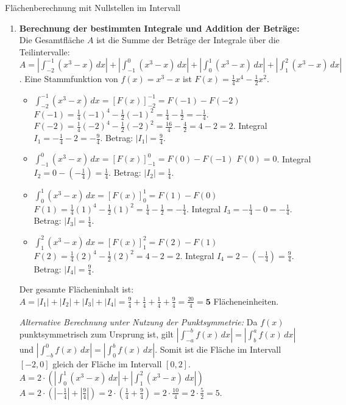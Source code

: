 \begin{loesungsumgebung}{Flächenberechnung mit Nullstellen im Intervall}
\begin{enumerate}
    \item \textbf{Berechnung der bestimmten Integrale und Addition der Beträge:}
    Die Gesamtfläche $A$ ist die Summe der Beträge der Integrale über die Teilintervalle:
    $A = \left| \int_{-2}^{-1} (x^3-x) \,dx \right| + \left| \int_{-1}^{0} (x^3-x) \,dx \right| + \left| \int_{0}^{1} (x^3-x) \,dx \right| + \left| \int_{1}^{2} (x^3-x) \,dx \right|$.
    Eine Stammfunktion von $f(x) = x^3-x$ ist $F(x) = \frac{1}{4}x^4 - \frac{1}{2}x^2$.
    \begin{itemize}
        \item $\int_{-2}^{-1} (x^3-x) \,dx = [F(x)]_{-2}^{-1} = F(-1) - F(-2)$
        $F(-1) = \frac{1}{4}(-1)^4 - \frac{1}{2}(-1)^2 = \frac{1}{4} - \frac{1}{2} = -\frac{1}{4}$.
        $F(-2) = \frac{1}{4}(-2)^4 - \frac{1}{2}(-2)^2 = \frac{16}{4} - \frac{4}{2} = 4 - 2 = 2$.
        Integral $I_1 = -\frac{1}{4} - 2 = -\frac{9}{4}$. Betrag: $|I_1| = \frac{9}{4}$.

        \item $\int_{-1}^{0} (x^3-x) \,dx = [F(x)]_{-1}^{0} = F(0) - F(-1)$
        $F(0) = 0$.
        Integral $I_2 = 0 - (-\frac{1}{4}) = \frac{1}{4}$. Betrag: $|I_2| = \frac{1}{4}$.

        \item $\int_{0}^{1} (x^3-x) \,dx = [F(x)]_{0}^{1} = F(1) - F(0)$
        $F(1) = \frac{1}{4}(1)^4 - \frac{1}{2}(1)^2 = \frac{1}{4} - \frac{1}{2} = -\frac{1}{4}$.
        Integral $I_3 = -\frac{1}{4} - 0 = -\frac{1}{4}$. Betrag: $|I_3| = \frac{1}{4}$.

        \item $\int_{1}^{2} (x^3-x) \,dx = [F(x)]_{1}^{2} = F(2) - F(1)$
        $F(2) = \frac{1}{4}(2)^4 - \frac{1}{2}(2)^2 = 4 - 2 = 2$.
        Integral $I_4 = 2 - (-\frac{1}{4}) = \frac{9}{4}$. Betrag: $|I_4| = \frac{9}{4}$.
    \end{itemize}
    Der gesamte Flächeninhalt ist:
    $A = |I_1| + |I_2| + |I_3| + |I_4| = \frac{9}{4} + \frac{1}{4} + \frac{1}{4} + \frac{9}{4} = \frac{20}{4} = \mathbf{5}$ Flächeneinheiten.

    \textit{Alternative Berechnung unter Nutzung der Punktsymmetrie:}
    Da $f(x)$ punktsymmetrisch zum Ursprung ist, gilt $\left| \int_{-a}^{-b} f(x) \,dx \right| = \left| \int_{b}^{a} f(x) \,dx \right|$ und $\left| \int_{-b}^{0} f(x) \,dx \right| = \left| \int_{0}^{b} f(x) \,dx \right|$.
    Somit ist die Fläche im Intervall $[-2,0]$ gleich der Fläche im Intervall $[0,2]$.
    $A = 2 \cdot \left( \left| \int_{0}^{1} (x^3-x) \,dx \right| + \left| \int_{1}^{2} (x^3-x) \,dx \right| \right)$
    $A = 2 \cdot \left( |-\frac{1}{4}| + |\frac{9}{4}| \right) = 2 \cdot \left( \frac{1}{4} + \frac{9}{4} \right) = 2 \cdot \frac{10}{4} = 2 \cdot \frac{5}{2} = 5$.
\end{enumerate}

\end{loesungsumgebung}


